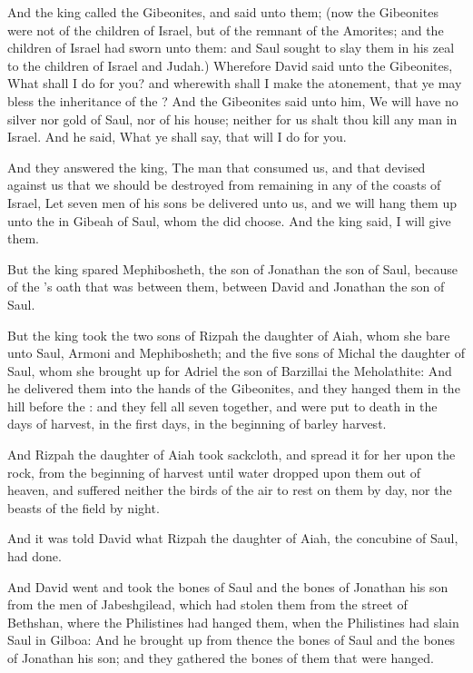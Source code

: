 \verse And the king called the Gibeonites, and said unto them; (now the Gibeonites were not of the children of Israel, but of the remnant of the Amorites; and the children of Israel had sworn unto them: and Saul sought to slay them in his zeal to the children of Israel and Judah.)  \verse Wherefore David said unto the Gibeonites, What shall I do for you?  and wherewith shall I make the atonement, that ye may bless the inheritance of the \LORD?  \verse And the Gibeonites said unto him, We will have no silver nor gold of Saul, nor of his house; neither for us shalt thou kill any man in Israel. And he said, What ye shall say, that will I do for you.

\verse And they answered the king, The man that consumed us, and that devised against us that we should be destroyed from remaining in any of the coasts of Israel, \verse Let seven men of his sons be delivered unto us, and we will hang them up unto the \LORD in Gibeah of Saul, whom the \LORD did choose. And the king said, I will give them.

\verse But the king spared Mephibosheth, the son of Jonathan the son of Saul, because of the \LORD's oath that was between them, between David and Jonathan the son of Saul.

\verse But the king took the two sons of Rizpah the daughter of Aiah, whom she bare unto Saul, Armoni and Mephibosheth; and the five sons of Michal the daughter of Saul, whom she brought up for Adriel the son of Barzillai the Meholathite: \verse And he delivered them into the hands of the Gibeonites, and they hanged them in the hill before the \LORD: and they fell all seven together, and were put to death in the days of harvest, in the first days, in the beginning of barley harvest.

\verse And Rizpah the daughter of Aiah took sackcloth, and spread it for her upon the rock, from the beginning of harvest until water dropped upon them out of heaven, and suffered neither the birds of the air to rest on them by day, nor the beasts of the field by night.

\verse And it was told David what Rizpah the daughter of Aiah, the concubine of Saul, had done.

\verse And David went and took the bones of Saul and the bones of Jonathan his son from the men of Jabeshgilead, which had stolen them from the street of Bethshan, where the Philistines had hanged them, when the Philistines had slain Saul in Gilboa: \verse And he brought up from thence the bones of Saul and the bones of Jonathan his son; and they gathered the bones of them that were hanged.

